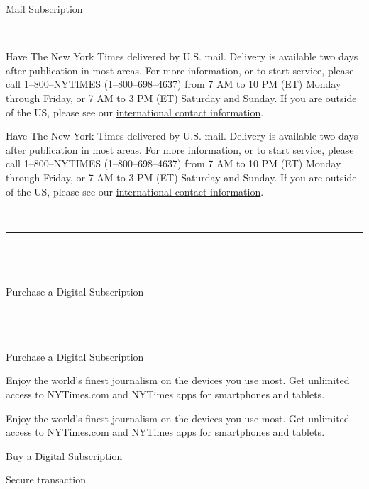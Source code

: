 Mail Subscription

~

Have The New York Times delivered by U.S. mail. Delivery is available
two days after publication in most areas. For more information, or to
start service, please call 1--800--NYTIMES (1--800--698--4637) from 7 AM
to 10 PM (ET) Monday through Friday, or 7 AM to 3 PM (ET) Saturday and
Sunday. If you are outside of the US, please see our
\href{https://help.nytimes3xbfgragh.onion/hc/en-us/articles/115014792927-International-contact-info}{international
contact information}.

Have The New York Times delivered by U.S. mail. Delivery is available
two days after publication in most areas. For more information, or to
start service, please call 1--800--NYTIMES (1--800--698--4637) from 7 AM
to 10 PM (ET) Monday through Friday, or 7 AM to 3 PM (ET) Saturday and
Sunday. If you are outside of the US, please see our
\href{https://help.nytimes3xbfgragh.onion/hc/en-us/articles/115014792927-International-contact-info}{international
contact information}.

~

\begin{center}\rule{0.5\linewidth}{\linethickness}\end{center}

\hypertarget{-10}{%
\section{}\label{-10}}

~

Purchase a Digital Subscription

~

\hypertarget{-11}{%
\section{}\label{-11}}

Purchase a Digital Subscription

Enjoy the world's finest journalism on the devices you use most. Get
unlimited access to NYTimes.com and NYTimes apps for smartphones and
tablets.

Enjoy the world's finest journalism on the devices you use most. Get
unlimited access to NYTimes.com and NYTimes apps for smartphones and
tablets.

\href{/subscription/multiproduct/lp8HYKU?campaignId=48LHJ}{Buy a Digital
Subscription }

Secure transaction

